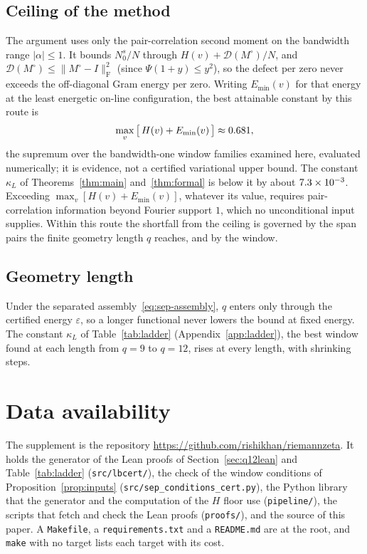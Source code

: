 \documentclass[11pt]{article}
\theoremstyle{definition}
\newcommand{\F}{\mathrm{F}}
\newcommand{\eps}{\varepsilon}
\begin{document}
\subsection{Ceiling of the method}
The argument uses only the pair-correlation second moment on the bandwidth
range $|\alpha|\le1$. It bounds $N_0^s/N$ through
$H(v)+\mathcal D(M^\circ)/N$, and $\mathcal D(M^\circ)\le\|M^\circ-I\|_{\F}^2$
(since $\Psi(1+y)\le y^2$), so the defect per zero never exceeds the off-diagonal
Gram energy per zero. Writing $E_{\min}(v)$ for that energy at the least
energetic on-line configuration, the best attainable constant by this route is
\[
  \max_v\big[\,H(v)+E_{\min}(v)\,\big]\approx0.681,
\]
the supremum over the bandwidth-one window families examined here, evaluated
numerically; it is evidence, not a certified variational upper bound. The
constant $\kappa_L$ of Theorems~\ref{thm:main} and~\ref{thm:formal} is below
it by about $7.3\times10^{-3}$. Exceeding
$\max_v[H(v)+E_{\min}(v)]$, whatever its value, requires pair-correlation
information beyond Fourier support $1$, which no unconditional input supplies.
Within this route the shortfall from the ceiling is governed by the span pairs
the finite geometry length $q$ reaches, and by the window.

\subsection{Geometry length}\label{sec:qlen}
Under the separated assembly~\eqref{eq:sep-assembly}, $q$ enters only through
the certified energy $\eps$, so a longer functional never lowers the bound at
fixed energy. The constant $\kappa_L$ of Table~\ref{tab:ladder}
(Appendix~\ref{app:ladder}), the best window found at each length from $q=9$
to $q=12$, rises at every length, with shrinking steps.

\section*{Data availability}

The supplement is the repository \url{https://github.com/rishikhan/riemannzeta}. It holds the
generator of the Lean proofs of Section~\ref{sec:q12lean} and Table~\ref{tab:ladder}
(\texttt{src/lbcert/}), the check of the window conditions of Proposition~\ref{prop:inputs}
(\texttt{src/sep\_conditions\_cert.py}), the Python library that the generator and the
computation of the $H$ floor use (\texttt{pipeline/}), the scripts that fetch and check the Lean proofs (\texttt{proofs/}), and
the source of this paper. A \texttt{Makefile}, a \texttt{requirements.txt} and a
\texttt{README.md} are at the root, and \texttt{make} with no target lists each target with its
cost.
\end{document}
